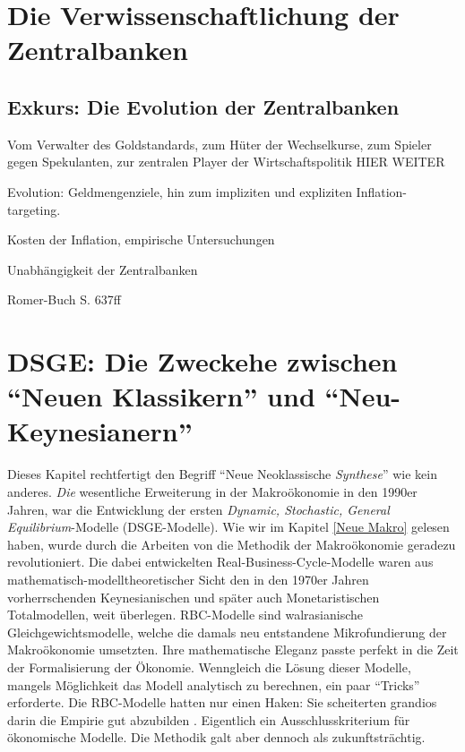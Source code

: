 \section{Die Verwissenschaftlichung der Zentralbanken}

\subsection{Exkurs: Die Evolution der Zentralbanken}
Vom Verwalter des Goldstandards, zum Hüter der Wechselkurse, zum Spieler gegen Spekulanten, zur zentralen Player der Wirtschaftspolitik
HIER WEITER


Evolution: Geldmengenziele, hin zum impliziten und expliziten Inflation-targeting.

Kosten der Inflation, empirische Untersuchungen

Unabhängigkeit der Zentralbanken

Romer-Buch S. 637ff


\section{DSGE: Die Zweckehe zwischen "`Neuen Klassikern"' und "`Neu-Keynesianern"'}

Dieses Kapitel rechtfertigt den Begriff "`Neue Neoklassische \textit{Synthese}"' wie kein anderes. \textit{Die} wesentliche Erweiterung in der Makroökonomie in den 1990er Jahren, war die Entwicklung der ersten \textit{Dynamic, Stochastic, General Equilibrium}-Modelle (DSGE-Modelle). Wie wir im Kapitel \ref{Neue Makro} gelesen haben, wurde durch die Arbeiten von \textcite{Kydland1982, Plosser1983} die Methodik der Makroökonomie geradezu revolutioniert. Die dabei entwickelten Real-Business-Cycle-Modelle waren aus mathematisch-modelltheoretischer Sicht den in den 1970er Jahren vorherrschenden Keynesianischen und später auch Monetaristischen Totalmodellen, weit überlegen. RBC-Modelle sind walrasianische Gleichgewichtsmodelle, welche die damals neu entstandene Mikrofundierung der Makroökonomie umsetzten. Ihre mathematische Eleganz passte perfekt in die Zeit der Formalisierung der Ökonomie. Wenngleich die Lösung dieser Modelle, mangels Möglichkeit das Modell analytisch zu berechnen, ein paar "`Tricks"' erforderte. Die RBC-Modelle hatten nur einen Haken: Sie scheiterten grandios darin die Empirie gut abzubilden \parencite[S. 309]{Romer2019}. Eigentlich ein Ausschlusskriterium für ökonomische Modelle. Die Methodik galt aber dennoch als zukunftsträchtig. 

